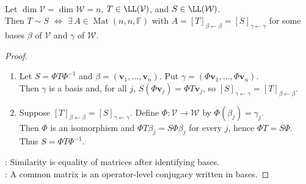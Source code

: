 \begin{proposition} \label{prop:operator-similarity-and-common-matrices} \\
Let $\dim\mathcal{V}=\dim\mathcal{W}=n$, $T\in\LL(\mathcal{V})$, and $S\in\LL(\mathcal{W})$.\\
Then $T\sim S$ $\Longleftrightarrow$ $\exists\,A\in\operatorname{Mat}(n,n,\mathbb{F})$ with $A=[T]_{\beta\leftarrow\beta}=[S]_{\gamma\leftarrow\gamma}$ for some bases $\beta$ of $\mathcal{V}$ and $\gamma$ of $\mathcal{W}$.
\begin{proof}
\begin{enumerate}[label=\roman*.]
\setlength{\itemsep}{0pt}
\item[$(\Rightarrow)$] Let $S=\Phi T\Phi^{-1}$ and $\beta=(\mathbf{v}_1,\ldots,\mathbf{v}_n)$. Put $\gamma=(\Phi\mathbf{v}_1,\ldots,\Phi\mathbf{v}_n)$.\\
Then $\gamma$ is a basis and, for all $j$, $S(\Phi\mathbf{v}_j)=\Phi T\mathbf{v}_j$, so $[S]_{\gamma\leftarrow\gamma}=[T]_{\beta\leftarrow\beta}$.
\item[$(\Leftarrow)$] Suppose $[T]_{\beta\leftarrow\beta}=[S]_{\gamma\leftarrow\gamma}$. Define $\Phi:\mathcal{V}\to\mathcal{W}$ by $\Phi(\beta_j)=\gamma_j$.\\
Then $\Phi$ is an isomorphism and $\Phi T\beta_j=S\Phi\beta_j$ for every $j$, hence $\Phi T=S\Phi$. Thus $S=\Phi T\Phi^{-1}$.
\end{enumerate}
: Similarity is equality of matrices after identifying bases.\\
: A common matrix is an operator-level conjugacy written in bases.
\end{proof}
\end{proposition}

